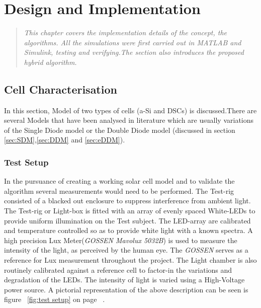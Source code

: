 \chapter{Design and Implementation}
\begin{quote} 
\it This chapter covers the implementation details of the concept, the algorithms. All the simulations were first carried out in MATLAB{\textregistered} and Simulink{\textregistered}, testing and verifying.The section also introduces the proposed hybrid algorithm.
\end{quote}

\section{Cell Characterisation}
In this section, Model of two types of cells (\ac{a-Si} and \ac{DSCs}) is discussed.There are several Models that have been analysed in literature which are usually variations of the Single Diode model or the Double Diode model (discussed in section \ref{sec:SDM},\ref{sec:DDM} and \ref{sec:eDDM}).
 
\subsection{Test Setup}

 In the pursuance of creating a working solar cell model and to validate the algorithm several measurements would need to be performed. The Test-rig consisted of a blacked out enclosure to suppress interference from ambient light. The Test-rig or Light-box is fitted with an array of evenly spaced White-\ac{LED}s to provide uniform illumination on the Test subject. The \ac{LED}-array are calibrated and temperature controlled so as to provide white light with a known spectra. A high precision Lux Meter(\textit{GOSSEN Mavolux 5032B}) is used to measure the  intensity of the light, as perceived by the human eye. The \textit{GOSSEN} serves as a reference for Lux measurement throughout the project. The Light chamber is also routinely calibrated against a reference cell to factor-in the variations and degradation of the \ac{LED}s. The intensity of light is varied using a High-Voltage power source. A pictorial representation of the above description can be seen is figure ~\ref{fig:test setup} on page ~\pageref{fig:test setup}. \\



